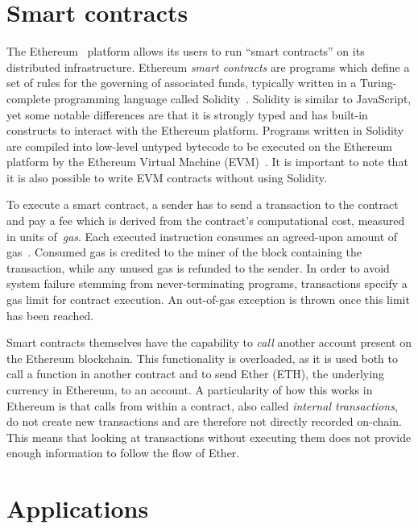 \section{Smart contracts}
The Ethereum~\cite{buterin2014} platform allows its users to run ``smart contracts'' on its distributed infrastructure.
Ethereum \emph{smart contracts} are programs which define a set of rules for the governing of associated funds, typically written in a Turing-complete programming language called Solidity~\cite{Dannen:2017:IES:3103305}.
Solidity is similar to JavaScript, yet some notable differences are that it is strongly typed and has built-in constructs to interact with the Ethereum platform.
Programs written in Solidity are compiled into low-level untyped bytecode to be executed on the Ethereum platform by the Ethereum Virtual Machine (EVM)~\cite{wood2014ethereum}.
It is important to note that it is also possible to write EVM contracts without using Solidity.

To execute a smart contract, a sender has to send a transaction to the contract and pay a fee which is derived from the contract's computational cost, measured in units of~\emph{gas}. Each executed instruction consumes an agreed-upon amount of gas~\cite{wood2014ethereum}. Consumed gas is credited to the miner of the block containing the transaction, while any unused gas is refunded to the sender. In order to avoid system failure stemming from never-terminating programs, transactions specify a gas limit for contract execution. An out-of-gas exception is thrown once this limit has been reached.

Smart contracts themselves have the capability to \emph{call} another account present on the Ethereum blockchain. This functionality is overloaded, as it is used both to call a function in another contract and to send Ether (ETH), the underlying currency in Ethereum, to an account. A particularity of how this works in Ethereum is that calls from within a contract, also called \emph{internal transactions}, do not create new transactions and are therefore not directly recorded on-chain. This means that looking at transactions without executing them does not provide enough information to follow the flow of Ether.


\section{Applications}

